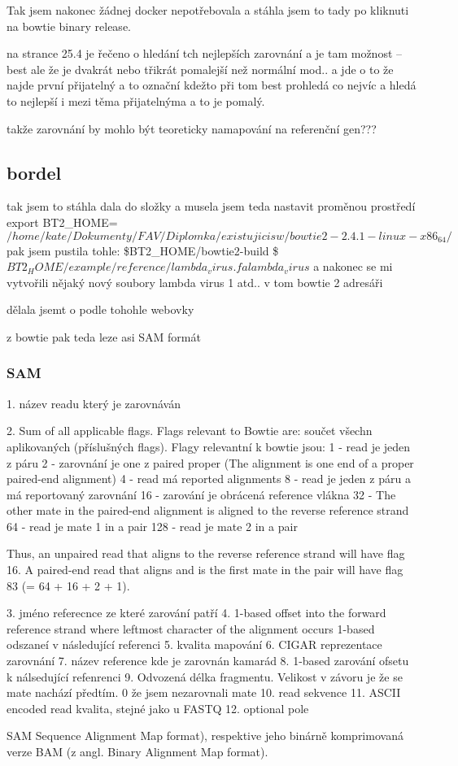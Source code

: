 \documentclass[czech,DP]{thesiskiv}
\begin{document}
Tak jsem nakonec žádnej docker nepotřebovala a stáhla jsem to tady %
 po kliknuti na bowtie binary release.

na strance 25.4 je řečeno o hledání tch nejlepších zarovnání a je tam možnost --best ale že je dvakrát nebo třikrát pomalejší než normální mod.. a jde o to že najde první přijatelný a to označní kdežto při tom best prohledá co nejvíc a hledá to nejlepší i mezi těma přijatelnýma a to je pomalý.

takže zarovnání by mohlo být teoreticky namapování na referenční gen???

\subsection{bordel}
tak jsem  to stáhla dala do složky a musela jsem teda nastavit proměnou prostředí 
export BT2\_HOME=$/home/kate/Dokumenty/FAV/Diplomka/existujicisw/bowtie2-2.4.1-linux-x86_64/$
pak jsem pustila tohle: 
\$BT2\_HOME/bowtie2-build \$ $BT2_HOME/example/reference/lambda_virus.fa lambda_virus$
a nakonec se mi vytvořili nějaký nový soubory lambda virus 1 atd.. v tom bowtie 2 adresáři

dělala jsemt o podle tohohle webovky %


z bowtie pak teda leze asi SAM formát

\subsubsection{SAM}
1. název readu který je zarovnáván

2. Sum of all applicable flags. Flags relevant to Bowtie are:
součet všechn aplikovaných (příslušných flags). Flagy relevantní k bowtie jsou: 
1 - read je jeden z páru
2 - zarovnání je one z paired proper (The alignment is one end of a proper paired-end alignment)
4 - read má reported alignments
8 - read je jeden z páru a má reportovaný zarovnání
16 - zarování je obrácená reference vlákna
32 - The other mate in the paired-end alignment is aligned to the reverse reference strand
64 - read je mate 1 in a pair
128 - read je mate 2 in a pair

Thus, an unpaired read that aligns to the reverse reference strand will have flag 16. A paired-end read that aligns and is the first mate in the pair will have flag 83 (= 64 + 16 + 2 + 1).

3. jméno referecnce ze které zarování patří
4. 1-based offset into the forward reference strand where leftmost character of the alignment occurs 1-based odszaneí v následující referenci 
5. kvalita mapování
6. CIGAR reprezentace zarovnání
7. název reference kde je zarovnán kamarád 
8. 1-based zarování ofsetu k nálsedující refenrenci 
9. Odvozená délka fragmentu. Velikost v závoru je že se mate nachází předtím. 0 že jsem nezarovnali mate
10. read sekvence
11. ASCII encoded read kvalita, stejné jako u FASTQ
12. optional pole


SAM Sequence Alignment Map format), respektive jeho binárně
komprimovaná verze BAM (z angl. Binary Alignment Map format).



% 
%
\nocite{*}

{\raggedright\small

}
\end{document}
